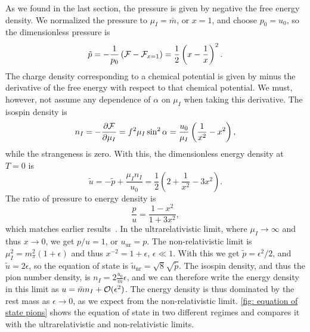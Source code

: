 As we found in the last section, the pressure is given by negative the free energy density. 
We normalized the pressure to $\mu_I = \bar m$, or $x = 1$, and choose $p_0 = u_0$, so the dimensionless pressure is
%
\begin{equation}
    \label{pressure leading order chpt}
    \tilde p = -\frac{1}{p_0} \left(\mathcal{F} - \mathcal{F}_{x=1}\right) 
    = \frac{1}{2} \left(x - \frac{1}{x}\right)^2.
\end{equation}
%
The charge density corresponding to a chemical potential is given by minus the derivative of the free energy with respect to that chemical potential. 
We must, however, not assume any dependence of $\alpha$ on $\mu_I$ when taking this derivative.
The isospin density is
%
\begin{equation}
    \label{isospin density}
    n_I = -\pdv{\mathcal{F}}{\mu_I} = f^2 \mu_I \sin^2 \alpha 
    = 
    \frac{u_0}{\mu_I} \left(\frac{1}{x^2} - x^2\right),
\end{equation}
%
while the strangeness is zero.
With this, the dimensionless energy density at $T = 0$ is
%
\begin{equation}
    \label{energy density leading order chpt}
    \tilde u = - \tilde p + \frac{\mu_I n_I}{u_0}
    = \frac{1}{2} \left( 2 + \frac{1}{x^2} - 3 x^2\right).
\end{equation}
%
The ratio of pressure to energy density is
%
\begin{equation} 
    \label{pressure energy ratio leading order chpt}
    \frac{p}{u} = \frac{1- x^2}{1+3x^2},
\end{equation}
%
which matches earlier results~\autocite{sonQCDFiniteIsospin2001}.
In the ultrarelativistic limit, where $\mu_I \rightarrow \infty$ and thus $x \rightarrow 0$, we get $p / u = 1$, or $u_\text{ur} = p$.
The non-relativistic limit is $\mu_I^2 = m_\pi^2(1 + \epsilon)$ and thus $x^{-2} = 1 + \epsilon$, $\epsilon \ll 1$.
With this we get $\tilde p = \epsilon^2 / 2 $, and $\tilde u = 2\epsilon$, so the equation of state is $\tilde u_\text{nr} = \sqrt 8 \sqrt{\tilde p}$.
The isospin density, and thus the pion number density, is $n_I = 2 \frac{u_0}{\bar m} \epsilon$, and we can therefore write the energy density in this limit as $u = \bar m n_I + \mathcal O(\epsilon^2)$.
The energy density is thus dominated by the rest mass as $\epsilon \rightarrow 0$, as we expect from the non-relativistic limit.
\autoref{fig: equation of state pions} shows the equation of state in two different regimes and compares it with the ultrarelativistic and non-relativistic limits.

